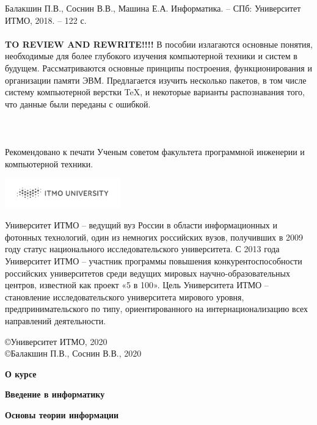 \documentclass[a5paper,14pt]{report}
\begin{document}
\begin{titlepage}
Балакшин П.В., Соснин В.В., Машина Е.А.  Информатика. – СПб: Университет ИТМО, 2018. – 122 с.
\\\\\textbf{TO REVIEW AND REWRITE!!!!} В пособии излагаются основные понятия, необходимые для более глубокого изучения компьютерной техники и систем в будущем. Рассматриваются основные принципы построения, функционирования и организации памяти ЭВМ. Предлагается изучить несколько пакетов, в том числе систему компьютерной верстки TeX, и некоторые варианты распознавания того, что данные были переданы с ошибкой.
\\\\\\\\Рекомендовано к печати Ученым советом факультета программной инженерии и компьютерной техники. 
\vspace{5 cm}
\begin{flushright}
\includegraphics[width=5cm]{ITMO_log}
\end{flushright}
Университет ИТМО – ведущий вуз России в области информационных и фотонных технологий, один из немногих российских вузов, получивших в 2009 году статус национального исследовательского университета. С 2013 года Университет ИТМО – участник программы повышения конкурентоспособности российских университетов среди ведущих мировых научно-образовательных центров, известной как проект «5 в 100». Цель Университета ИТМО – становление исследовательского университета мирового уровня, предпринимательского по типу, ориентированного на интернационализацию всех направлений деятельности. 
\begin{flushright}
\copyright Университет ИТМО, 2020
\\\copyright Балакшин П.В., Соснин В.В., 2020
\end{flushright}
\end{titlepage}

\tableofcontents
\newpage
\textbf{О курсе\\}


\newpage
\textbf{Введение в информатику\\}


\newpage
\textbf{Основы теории информации\\}

\end{document}
